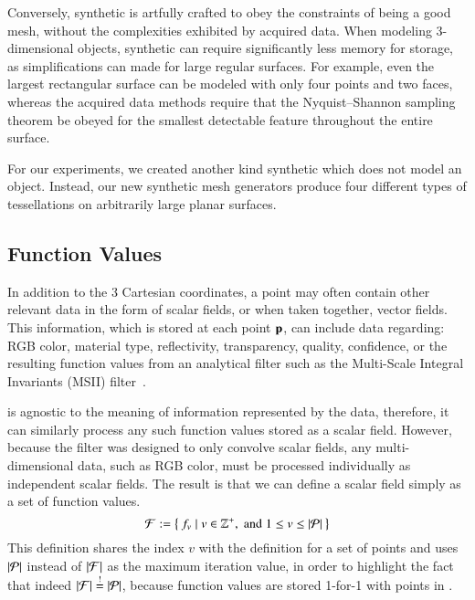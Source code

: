 Conversely, synthetic \tdd{} is artfully crafted to obey the constraints of being a good mesh, without the complexities exhibited by acquired data. When modeling 3-dimensional objects, synthetic \tdd{} can require significantly less memory for storage, as simplifications can made for large regular surfaces. For example, even the largest rectangular surface can be modeled with only four points and two faces, whereas the acquired data methods require that the Nyquist–Shannon sampling theorem be obeyed for the smallest detectable feature throughout the entire surface.

For our experiments, we created another kind synthetic \tdd{} which does not model an object. Instead, our new synthetic mesh generators produce four different types of tessellations on arbitrarily large planar surfaces.
%
\subsection{Function Values}
\label{ch2s3ssFV}
In addition to the 3 Cartesian coordinates, a point may often contain other relevant data in the form of scalar fields, or when taken together, vector fields. This information, which is stored at each point $\mathbf{p}$, can include data regarding: RGB color, material type, reflectivity, transparency, quality, confidence, or the resulting function values from an analytical filter such as the Multi-Scale Integral Invariants (MSII) filter~\cite[p.~21]{Mara12}.

 is agnostic to the meaning of information represented by the data, therefore, it can similarly process any such function values stored as a scalar field. However, because the filter was designed to only convolve scalar fields, any multi-dimensional data, such as RGB color, must be processed individually as independent scalar fields. The result is that we can define a scalar field simply as a set of function values.
%
\begin{equation}
	\mathcal{F} := \left \{\: f_v \mid v \in \mathbb{Z}^+, \;\text{and}\; 1\leq v \leq|\mathcal{P}| \:\right \}
	\label{eq:defineSetOfFunctionValues}
\end{equation}%
%
%
%
%
%
This definition shares the index $v$ with the definition for a set of points and uses $|\mathcal{P}|$ instead of $|\mathcal{F}|$ as the maximum iteration value, in order to highlight the fact that indeed $|\mathcal{F}| \overset{!}{=} |\mathcal{P}|$, because function values are stored 1-for-1 with points in \tdd{}.
%
%
%
%
%
